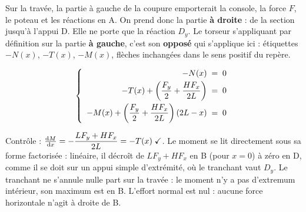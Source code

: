 Sur la travée, la partie à gauche de la coupure emporterait la console, la force $F$, le poteau et les réactions en A. On prend donc la partie \textbf{à droite} : de la section jusqu'à l'appui D. Elle ne porte que la réaction $D_y$. Le torseur s'appliquant par définition sur la partie \textbf{à gauche}, c'est son \textbf{opposé} qui s'applique ici : étiquettes $-N(x)$, $-T(x)$, $-M(x)$, flèches inchangées dans le sens positif du repère.

\noindent\begin{minipage}[c]{0.48\textwidth}
\[ \left\{\begin{array}{r@{\;\;=\;\;}l}
  -N(x) & 0\\[3pt]
  -T(x) + \left(\dfrac{F_y}{2}+\dfrac{HF_x}{2L}\right) & 0\\[9pt]
  -M(x) + \left(\dfrac{F_y}{2}+\dfrac{HF_x}{2L}\right)(2L-x) & 0
\end{array}\right. \]
\end{minipage}\hfill
\begin{minipage}[c]{0.50\textwidth}
\centering
{}
\end{minipage}

Contrôle : $\frac{\mathrm{d}M}{\mathrm{d}x} = -\dfrac{LF_y + HF_x}{2L} = -T(x) \;\checkmark$. Le moment se lit directement sous sa forme factorisée : linéaire, il décroît de $LF_y + HF_x$ en B (pour $x = 0$) à zéro en D, comme il se doit sur un appui simple d'extrémité, où le tranchant vaut $D_y$. Le tranchant ne s'annule nulle part sur la travée : le moment n'y a pas d'extremum intérieur, son maximum est en B. L'effort normal est nul : aucune force horizontale n'agit à droite de B.

